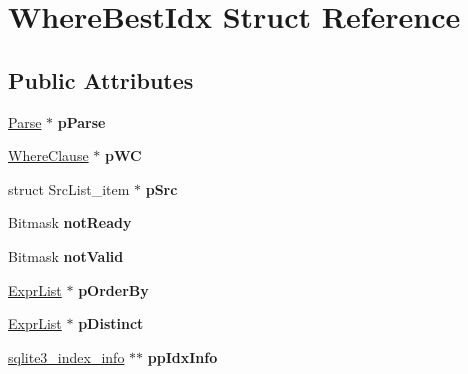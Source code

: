 \hypertarget{struct_where_best_idx}{\section{Where\-Best\-Idx Struct Reference}
\label{struct_where_best_idx}
}
\subsection*{Public Attributes}
\begin{DoxyCompactItemize}
\item 
\hypertarget{struct_where_best_idx_a22fb342e638ca2d8075c8508fb8ffc8b}{\hyperlink{struct_parse}{Parse} $\ast$ {\bfseries p\-Parse}}\label{struct_where_best_idx_a22fb342e638ca2d8075c8508fb8ffc8b}

\item 
\hypertarget{struct_where_best_idx_af7a4b84bd00c5c0c446a96c92dfe94f5}{\hyperlink{struct_where_clause}{Where\-Clause} $\ast$ {\bfseries p\-W\-C}}\label{struct_where_best_idx_af7a4b84bd00c5c0c446a96c92dfe94f5}

\item 
\hypertarget{struct_where_best_idx_a1452df95a88b69b69172a2ab78ba3d25}{struct Src\-List\-\_\-item $\ast$ {\bfseries p\-Src}}\label{struct_where_best_idx_a1452df95a88b69b69172a2ab78ba3d25}

\item 
\hypertarget{struct_where_best_idx_a6975eb3c5ef5244f2e26225ba844b127}{Bitmask {\bfseries not\-Ready}}\label{struct_where_best_idx_a6975eb3c5ef5244f2e26225ba844b127}

\item 
\hypertarget{struct_where_best_idx_a3520858b21506fe6b35ae2718dc721be}{Bitmask {\bfseries not\-Valid}}\label{struct_where_best_idx_a3520858b21506fe6b35ae2718dc721be}

\item 
\hypertarget{struct_where_best_idx_aa3331a73e26ff20338e7c8daecaaa856}{\hyperlink{struct_expr_list}{Expr\-List} $\ast$ {\bfseries p\-Order\-By}}\label{struct_where_best_idx_aa3331a73e26ff20338e7c8daecaaa856}

\item 
\hypertarget{struct_where_best_idx_ae1fa1269634e87e730ad9db8e201ba72}{\hyperlink{struct_expr_list}{Expr\-List} $\ast$ {\bfseries p\-Distinct}}\label{struct_where_best_idx_ae1fa1269634e87e730ad9db8e201ba72}

\item 
\hypertarget{struct_where_best_idx_a34afa3a9869e746fa5aab97bc922ff6b}{\hyperlink{structsqlite3__index__info}{sqlite3\-\_\-index\-\_\-info} $\ast$$\ast$ {\bfseries pp\-Idx\-Info}}\label{struct_where_best_idx_a34afa3a9869e746fa5aab97bc922ff6b}


\end{DoxyCompactItemize}

